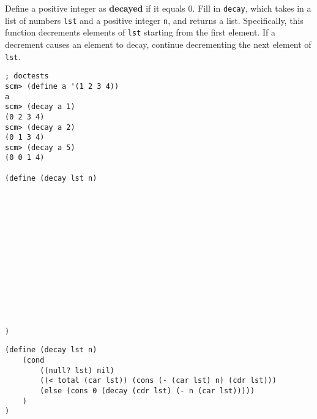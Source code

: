 \begin{blocksection}
\question
Define a positive integer as \textbf{decayed} if it equals 0. Fill in \lstinline{decay}, which takes in a list of numbers \lstinline{lst} and a positive integer \lstinline{n}, and returns a list. Specifically, this function decrements elements of \lstinline{lst} starting from the first element. If a decrement causes an element to decay, continue decrementing the next element of \lstinline{lst}.

\begin{lstlisting}
; doctests
scm> (define a '(1 2 3 4))
a
scm> (decay a 1)
(0 2 3 4)
scm> (decay a 2)
(0 1 3 4)
scm> (decay a 5)
(0 0 1 4)

(define (decay lst n)














)
\end{lstlisting}
\end{blocksection}

\begin{blocksection}
\begin{solution}
\begin{lstlisting}
(define (decay lst n)
    (cond 
        ((null? lst) nil)
        ((< total (car lst)) (cons (- (car lst) n) (cdr lst)))
        (else (cons 0 (decay (cdr lst) (- n (car lst)))))
    )
)
\end{lstlisting}
\end{solution}
\end{blocksection}